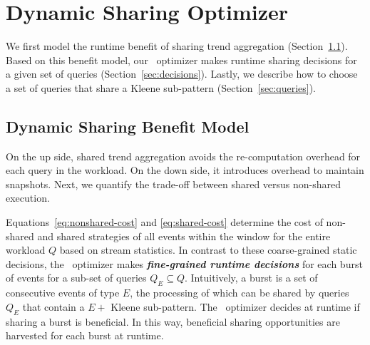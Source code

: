 \section{Dynamic Sharing Optimizer}
\label{sec:runtime}



We first model the runtime benefit of sharing trend aggregation  (Section~\ref{sec:dynamic-benefit}). Based on this benefit model, our \app\ optimizer makes runtime sharing decisions for a given set of queries (Section~\ref{sec:decisions}).
Lastly, we describe how to choose a set of queries that share a Kleene sub-pattern (Section~\ref{sec:queries}).


\subsection{Dynamic Sharing Benefit Model}
\label{sec:dynamic-benefit}

On the up side, shared trend aggregation avoids the re-computation overhead for each query in the workload. 
On the down side, it introduces overhead to maintain snapshots. 
Next, we quantify the trade-off between shared versus non-shared execution.

Equations~\ref{eq:nonshared-cost} and \ref{eq:shared-cost} determine the cost of non-shared and shared strategies of all events within the  window for the entire workload $Q$ based on stream statistics.
In contrast to these coarse-grained static decisions, the \app\ optimizer makes \textbf{\textit{fine-grained runtime decisions}} for each burst of events for a sub-set of queries $Q_E \subseteq Q$. 
%
Intuitively, a burst is a set of consecutive events of type $E$, the processing of which can be shared by  queries $Q_E$ that contain a $E+$ Kleene sub-pattern. The \app\ optimizer decides at runtime if sharing a burst is beneficial. In this way, beneficial sharing opportunities are harvested for each burst at runtime.


